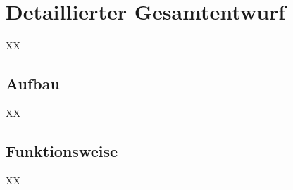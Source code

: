 \newpage
\chapter{Detaillierter Gesamtentwurf}
XX


\section{Aufbau}

XX

\section{Funktionsweise}
XX